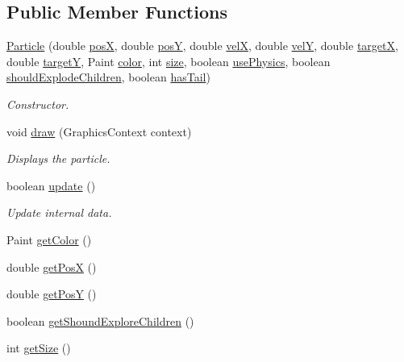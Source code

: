 \subsection*{Public Member Functions}
\begin{DoxyCompactItemize}
\item 
\hyperlink{classbattleship2D_1_1ui_1_1Particle_a88a64982ac1370fbc6d9eeb737e9716f}{Particle} (double \hyperlink{classbattleship2D_1_1ui_1_1Particle_a43ea7800c7ba89fcc30583e2cc0970e4}{pos\-X}, double \hyperlink{classbattleship2D_1_1ui_1_1Particle_ad049d4283943c3eb9f3ed76dfdb585c2}{pos\-Y}, double \hyperlink{classbattleship2D_1_1ui_1_1Particle_a9e831b513842b2cd2e41fc1a2524e590}{vel\-X}, double \hyperlink{classbattleship2D_1_1ui_1_1Particle_a75fa162ccfdadf4b05828097a4e1549c}{vel\-Y}, double \hyperlink{classbattleship2D_1_1ui_1_1Particle_adac981aee070e317de343ce7b5967b73}{target\-X}, double \hyperlink{classbattleship2D_1_1ui_1_1Particle_a0c427daa62b3aa8f58077879af4e4c24}{target\-Y}, Paint \hyperlink{classbattleship2D_1_1ui_1_1Particle_a0b9479695af9d931940e2bdff6877e80}{color}, int \hyperlink{classbattleship2D_1_1ui_1_1Particle_aeed0f277dadb5f0f4d41d7852ee8f708}{size}, boolean \hyperlink{classbattleship2D_1_1ui_1_1Particle_ad1d8ec268600a69b4ae2986c9b1e4ec1}{use\-Physics}, boolean \hyperlink{classbattleship2D_1_1ui_1_1Particle_ae89e92c546d7ab12b38a1da0ed34470c}{should\-Explode\-Children}, boolean \hyperlink{classbattleship2D_1_1ui_1_1Particle_aecbdfda0673ec091a555cbf5c18d346f}{has\-Tail})
\begin{DoxyCompactList}\small\item\em Constructor. \end{DoxyCompactList}\item 
void \hyperlink{classbattleship2D_1_1ui_1_1Particle_a160552441cdc69887bc6892f7bc41283}{draw} (Graphics\-Context context)
\begin{DoxyCompactList}\small\item\em Displays the particle. \end{DoxyCompactList}\item 
boolean \hyperlink{classbattleship2D_1_1ui_1_1Particle_a6f794d4df9bd0c74a71e7176071e3b79}{update} ()
\begin{DoxyCompactList}\small\item\em Update internal data. \end{DoxyCompactList}\item 
Paint \hyperlink{classbattleship2D_1_1ui_1_1Particle_a76e9ff34c208baa589c1f53f81fa4f48}{get\-Color} ()
\item 
double \hyperlink{classbattleship2D_1_1ui_1_1Particle_af870562265e0aa8584ae3d3deeb60b05}{get\-Pos\-X} ()
\item 
double \hyperlink{classbattleship2D_1_1ui_1_1Particle_a06aa365f8a9a2e746e878656182e6fc5}{get\-Pos\-Y} ()
\item 
boolean \hyperlink{classbattleship2D_1_1ui_1_1Particle_a138fd341ae6fcc9a1f0bb0dbdbd9d989}{get\-Shound\-Explore\-Children} ()
\item 
int \hyperlink{classbattleship2D_1_1ui_1_1Particle_a4c81950e35f0a19c0367d4df79e958e5}{get\-Size} ()
\end{DoxyCompactItemize}
